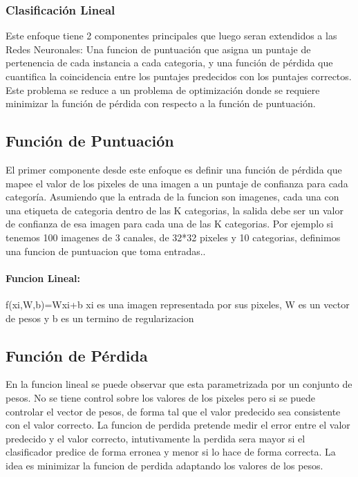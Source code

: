 \documentclass[a4paper,12pt,spanish]{book}
\begin{document}
      \subsubsection{Clasificación Lineal}
	Este enfoque tiene 2 componentes principales que luego seran extendidos a las Redes Neuronales: Una funcion de puntuación que asigna un puntaje de pertenencia de cada instancia a cada categoria, 
	y una función de pérdida que cuantifica la coincidencia entre los puntajes predecidos con los puntajes correctos.
	Este problema se reduce a un problema de optimización donde se requiere minimizar la función de pérdida con respecto a la función de puntuación.

    \subsection{Función de Puntuación}
      El primer componente desde este enfoque es definir una función de pérdida que mapee el valor de los pixeles de una imagen a un puntaje de confianza para cada categoría.
      Asumiendo que la entrada de la funcion son imagenes, cada una con una etiqueta de categoria dentro de las K categorias, la salida debe ser un valor de confianza de esa imagen 
      para cada una de las K categorias.
    Por ejemplo si tenemos 100 imagenes de 3 canales, de 32*32 pixeles y 10 categorias, definimos una funcion de puntuacion que toma entradas..

      \paragraph{Funcion Lineal:} 
	f(xi,W,b)=Wxi+b
	xi es una imagen representada por sus pixeles, W es un vector de pesos y b es un termino de regularizacion

    \subsection{Función de Pérdida}
      En la funcion lineal se puede observar que esta parametrizada por un conjunto de pesos.
      No se tiene control sobre los valores de los pixeles pero si se puede controlar el vector de pesos, de forma tal que el valor predecido sea consistente con el valor correcto. 
      La funcion de perdida pretende medir el error entre el valor predecido y el valor correcto, intutivamente la perdida sera mayor si el clasificador predice de forma erronea y 
      menor si lo hace de forma correcta.
      La idea es minimizar la funcion de perdida adaptando los valores de los pesos.
\end{document}
